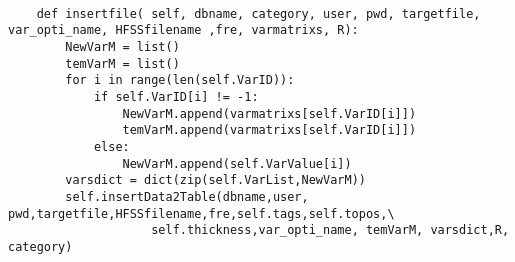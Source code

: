 \newpage

\setcounter{section}{0}
\renewcommand{\myappendixname}{数据库系统存储数据代码1}
\myappendix
\begin{verbatim}

    def insertfile( self, dbname, category, user, pwd, targetfile, var_opti_name, HFSSfilename ,fre, varmatrixs, R):    
        NewVarM = list()
        temVarM = list()
        for i in range(len(self.VarID)):
            if self.VarID[i] != -1:
                NewVarM.append(varmatrixs[self.VarID[i]])
                temVarM.append(varmatrixs[self.VarID[i]])
            else:
                NewVarM.append(self.VarValue[i])
        varsdict = dict(zip(self.VarList,NewVarM))
        self.insertData2Table(dbname,user, pwd,targetfile,HFSSfilename,fre,self.tags,self.topos,\
                    self.thickness,var_opti_name, temVarM, varsdict,R, category)   
         \end{verbatim}
\renewcommand{\myappendixname}{数据库系统存储数据代码2}
\myappendix   

